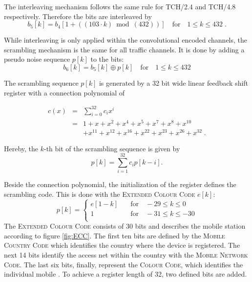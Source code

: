 The interleaving mechanism follows the same rule for TCH/2.4 and TCH/4.8 respectively. Therefore the bits are interleaved by
\begin{equation}
b_5[k] = b_4\left[ 1+ \left((103 \cdot k) \bmod (432) \right )  \right] \quad \text{for} \quad 1 \leq k \leq 432 \;.
\label{eq:int_tx}
\end{equation}

While interleaving is only applied within the convolutional encoded channels, the scrambling mechanism is the same for all traffic channels. It is done by adding a pseudo noise sequence $p[k]$ to the bits:
\begin{equation}
b_6[k] = b_5[k] \oplus p[k] \quad \text{for} \quad 1 \leq k \leq 432
\end{equation}

The scrambling sequence $p[k]$ is generated by a 32 bit wide linear feedback shift register with a connection polynomial of

\begin{eqnarray*}
c(x) 	&=& \sum_{i=0}^{32}{c_i x^i}\\
			&=& 1+x+x^2+x^4+x^5+x^7+x^8+x^{10} \\
			& & +x^{11}+x^{12}+x^{16}+x^{22}+x^{23}+x^{26}+x^{32} \;.
\end{eqnarray*}

Hereby, the $k$-th bit of the scrambling sequence is given by
\begin{equation}
p[k] = \sum_{i=1}^{32}c_i p[k-i].
\end{equation}

Beside the connection polynomial, the initialization of the register defines the scrambling code. This is done with the \textsc{Extended Colour Code} $e[k]$:
\begin{equation}
p[k] = \begin{cases}
e[1-k]  & \quad \text{for} \quad -29 \leq k \leq 0 \\
1				& \quad \text{for} \quad -31 \leq k \leq -30 \\
\end{cases}
\end{equation}
The \textsc{Extended Colour Code} consists of 30 bits and describes the mobile station according to figure \ref{fig:ECC}. The first ten bits are defined by the \textsc{Mobile Country Code} which identifies the country where the device is registered. The next 14 bits identify the access net within the country with the \textsc{Mobile Network Code}. The last six bits, finally, represent the \textsc{Colour Code}, which identifies the individual mobile \cite{DigCom_tetra}. To achieve a register length of 32, two defined bits are added.


